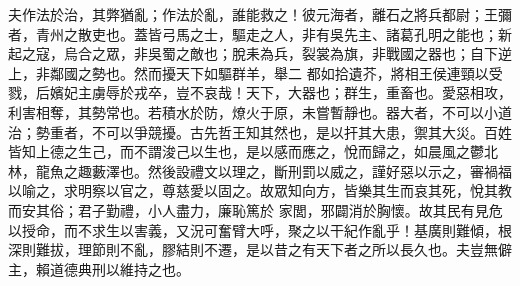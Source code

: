 \begin{pinyinscope}
 夫作法於治，其弊猶亂；作法於亂，誰能救之！彼元海者，離石之將兵都尉；王彌者，青州之散吏也。蓋皆弓馬之士，驅走之人，非有吳先主、諸葛孔明之能也；新起之寇，烏合之眾，非吳蜀之敵也；脫耒為兵，裂裳為旗，非戰國之器也；自下逆上，非鄰國之勢也。然而擾天下如驅群羊，舉二
 都如拾遺芥，將相王侯連頸以受戮，后嬪妃主虜辱於戎卒，豈不哀哉！天下，大器也；群生，重畜也。愛惡相攻，利害相奪，其勢常也。若積水於防，燎火于原，未嘗暫靜也。器大者，不可以小道治；勢重者，不可以爭競擾。古先哲王知其然也，是以扞其大患，禦其大災。百姓皆知上德之生己，而不謂浚己以生也，是以感而應之，悅而歸之，如晨風之鬱北林，龍魚之趣藪澤也。然後設禮文以理之，斷刑罰以威之，謹好惡以示之，審禍福以喻之，求明察以官之，尊慈愛以固之。故眾知向方，皆樂其生而哀其死，悅其教而安其俗；君子勤禮，小人盡力，廉恥篤於
 家閭，邪闢消於胸懷。故其民有見危以授命，而不求生以害義，又況可奮臂大呼，聚之以干紀作亂乎！基廣則難傾，根深則難拔，理節則不亂，膠結則不遷，是以昔之有天下者之所以長久也。夫豈無僻主，賴道德典刑以維持之也。




\end{pinyinscope}
